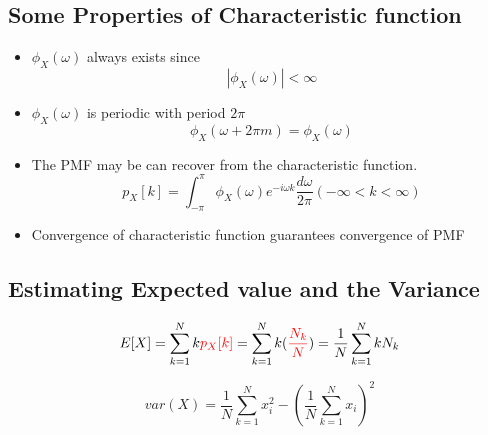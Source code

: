 \subsection{Some Properties of Characteristic function}
\begin{itemize}
	\item $\phi_{X}(\omega)$ always exists since
		\begin{equation*}
			|\phi_{X}(\omega)|<\infty
		\end{equation*}
	\item $\phi_{X}(\omega)$ is periodic with period $2\pi$
		\begin{equation*}
			\phi_{X}(\omega+2\pi m)=\phi_{X}(\omega)
		\end{equation*}
	\item  The PMF may be can recover from the characteristic function.
		\begin{equation*}
                        p_{X}[k]=\int^{\pi}_{-\pi}\phi_{X}(\omega)e^{-i\omega k}\frac{d\omega}{2\pi}  (-\infty< k <\infty)
		\end{equation*}

	\item Convergence of characteristic function guarantees convergence of PMF

\end{itemize}

\subsection{Estimating Expected value and the Variance}
\begin{equation*}
           E[X]=\sum_{k=1}^{N}k{\color{red}{p_{X}[k]}}=\sum_{k=1}^{N}k({\color{red}\frac{N_{k}}{N}})=\frac{1}{N}\sum_{k=1}^{N}kN_{k} 
\end{equation*}

\begin{equation*}
           var(X)=\frac{1}{N}\sum_{k=1}^{N}x_{i}^{2}- (\frac{1}{N}\sum_{k=1}^{N}x_{i})^{2}
\end{equation*}
